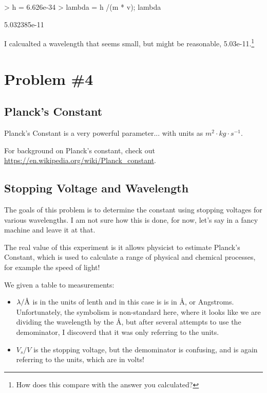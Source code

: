 \documentclass{article}
\newcommand{\angstrom}{\textup{\AA}}
\begin{document}
\begin{Schunk}
\begin{Sinput}
> h = 6.626e-34
> lambda = h /(m * v); lambda
\end{Sinput}
\begin{Soutput}
[1] 5.032385e-11
\end{Soutput}
\end{Schunk}

I calcualted a wavelength that seems small, but might be reasonable, 5.03e-11.\footnote{How does this compare with the answer you calculated?}

\section{Problem \#4}

\subsection{Planck's Constant}

Planck's Constant is a very powerful parameter... with units as $m^2 \cdot kg \cdot s^{-1}$. 

For background on Planck's constant, check out \url{https://en.wikipedia.org/wiki/Planck_constant}. 

\subsection{Stopping Voltage and Wavelength}

The goals of this problem is to determine the constant using stopping voltages for various wavelengths. I am not sure how this is done, for now, let's say in a fancy machine and leave it at that.

The real value of this experiment is it allows physicist to estimate Planck's Constant, which is used to calculate a range of physical and chemical processes, for example the speed of light!

We given a table to measurements: 
\begin{itemize}
\item $\lambda/\angstrom$ is in the units of lenth and in this case is is in \angstrom, or Angstroms. Unfortunately, the symbolism is non-standard here, where it looks like we are dividing the wavelength by the \angstrom, but after several attempts to use the demominator, I discoverd that it was only referring to the units. 

\item $V_s/V$ is the stopping voltage, but the demominator is confusing, and is again referring to the units, which are in volts!
\end{itemize}
\end{document}
